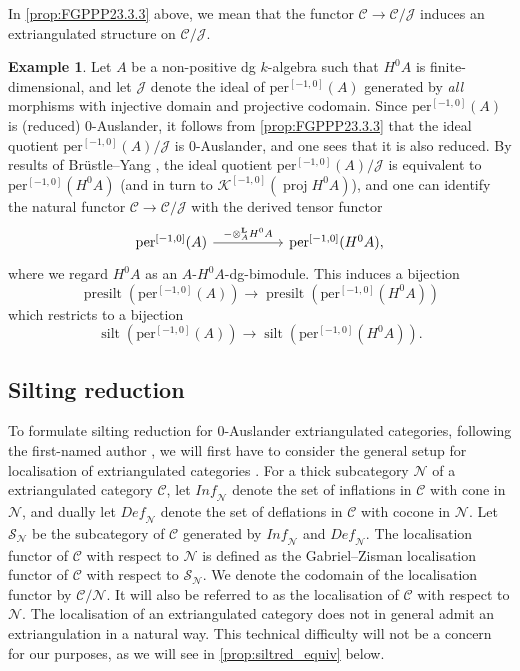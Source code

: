 \documentclass[10pt,twoside, a4paper,reqno]{amsart}
\DeclareMathOperator{\silt}{silt}
\DeclareMathOperator{\presilt}{presilt}
\DeclareMathOperator{\proj}{proj}
\newcommand{\Ktwo}{\mathcal{K}^{[-1,0]}}
\newcommand{\pertwo}{\mathrm{per}^{[-1,0]}}
\newcommand{\derotimes}[1]{\otimes_{#1}^{\mathbf{L}}}
\newcommand{\calN}{\mathcal{N}}
\newcommand{\calC}{\mathcal{C}}
\theoremstyle{definition}
\newtheorem{example}[theorem]{Example}
\begin{document}
In \eqref{prop:FGPPP23.3.3} above, we mean that the functor $\calC \to \calC/\mathcal{J}$ induces an extriangulated structure on $\calC/\mathcal{J}$.

\begin{example}
    Let $A$ be a non-positive dg $k$-algebra such that $H^0A$ is finite-dimensional, and let $\mathcal{J}$ denote the ideal of $\pertwo(A)$ generated by \textit{all} morphisms with injective domain and projective codomain. Since $\pertwo(A)$ is (reduced) 0-Auslander, it follows from \eqref{prop:FGPPP23.3.3} that the ideal quotient $\pertwo(A)/\mathcal{J}$ is 0-Auslander, and one sees that it is also reduced. By results of Brüstle--Yang \cite[Appendix A]{BY14}, the ideal quotient $\pertwo(A)/\mathcal{J}$ is equivalent to $\pertwo(H^0A)$ (and in turn to $\Ktwo(\proj H^0A)$), and one can identify the natural functor $\calC\to\calC/\mathcal{J}$ with the derived tensor functor
    \begin{equation*}
    \begin{tikzcd}[column sep=5em]
        \pertwo(A) \arrow[r,"{-\derotimes{A}H^0A}"] & \pertwo(H^0A),
    \end{tikzcd}
    \end{equation*}
    where we regard $H^0A$ as an $A$-$H^0A$-dg-bimodule. This induces a bijection
    \begin{equation*}
        {\presilt(\pertwo(A)) \to \presilt(\pertwo(H^0A))}
    \end{equation*}
    which restricts to a bijection
        \begin{equation*}
       {\silt(\pertwo(A)) \to \silt(\pertwo(H^0A))}.
    \end{equation*}
\end{example}

\subsection{Silting reduction}

To formulate silting reduction for 0-Auslander extriangulated categories, following the first-named author \cite{Bor24}, we will first have to consider the general setup for localisation of extriangulated categories \cite[§4.1]{NOS22}. 
For a thick subcategory $\calN$ of a extriangulated category $\calC$, let $\mathit{Inf}_{\calN}$ denote the set of inflations in $\calC$ with cone in $\calN$, and dually let $\mathit{Def}_{\calN}$ denote
the set of deflations in $\calC$ with cocone in $\calN$. Let $\mathcal{S}_{\calN}$ be the subcategory
of $\calC$ generated by $\mathit{Inf}_{\calN}$ and $\mathit{Def}_{\calN}$. The localisation functor of $\calC$ with respect to $\calN$ {is defined} as the Gabriel--Zisman localisation {functor} \cite{GZ12} of $\calC$ with respect to $\mathcal{S}_{\calN}$. We denote the codomain of the localisation functor by $\calC/\calN$. It will also be referred to as the localisation of $\calC$ with respect to $\calN$.
The localisation of an extriangulated category does not in general admit an extriangulation in a natural way. This technical difficulty will not be a concern for our purposes, as we will see in \eqref{prop:siltred_equiv} below.
\end{document}

